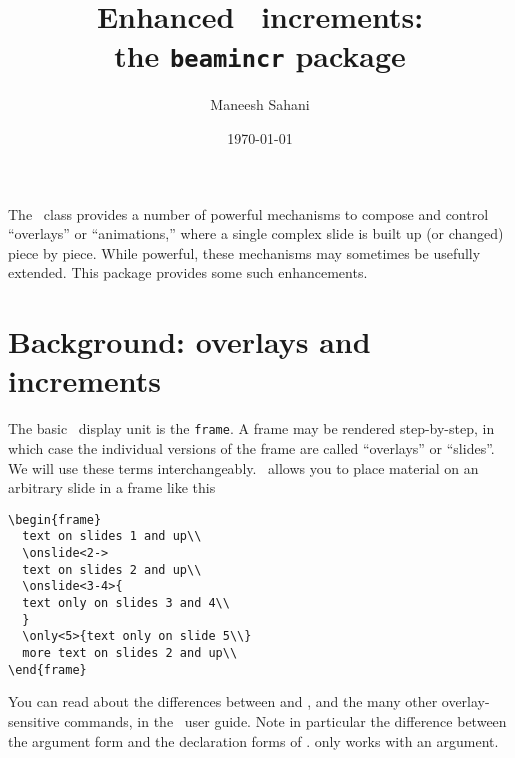 \documentclass[a4paper]{ltxdoc}
\title{Enhanced \beamer\ increments:\\
the \texttt{beamincr} package}
\author{Maneesh Sahani}
\date{\today}
\begin{document}
\maketitle

\noindent
The \beamer\ class provides a number of powerful mechanisms to compose
and control ``overlays'' or ``animations,'' where a single complex
slide is built up (or changed) piece by piece.
%
While powerful, these mechanisms may sometimes be usefully extended.  This
package provides some such enhancements.

\section{Background: overlays and increments}

The basic \beamer\ display unit is the \texttt{frame}.  A
frame may be rendered step-by-step, in which case the individual
versions of the frame are called ``overlays'' or ``slides''.  We will
use these terms interchangeably.
%
\beamer\ allows you to place material on an arbitrary slide in a frame like this
\example
\begin{verbatim}
\begin{frame}
  text on slides 1 and up\\
  \onslide<2->
  text on slides 2 and up\\
  \onslide<3-4>{
  text only on slides 3 and 4\\
  } 
  \only<5>{text only on slide 5\\}
  more text on slides 2 and up\\
\end{frame}
\end{verbatim}
You can read about the differences between 
and , and the many other overlay-sensitive
commands, in the \beamer\ user guide.  Note in particular the
difference between the argument form and the declaration forms of
.   only works with an
argument.
\end{document}
